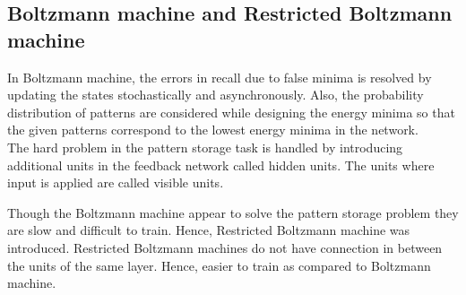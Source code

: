 \begin{spacing}{1.5}
\subsection{Boltzmann machine and Restricted Boltzmann machine}
In Boltzmann machine, the errors in recall due to false minima is resolved by updating the states stochastically and asynchronously. Also, the probability distribution of patterns are considered while designing the energy minima so that the given patterns correspond to the lowest energy minima in the network. \\
The hard problem in the pattern storage task is handled by introducing additional units in the feedback network called hidden units. The units where input is applied are called visible units.

Though the Boltzmann machine appear to solve the pattern storage problem they are slow and difficult to train. Hence, Restricted Boltzmann machine was introduced. Restricted Boltzmann machines do not have connection in between the units of the same layer. Hence, easier to train as compared to Boltzmann machine.
\end{spacing} 
